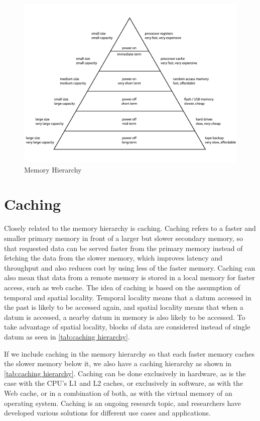 \documentclass[
	12pt,
	a4paper,
	abstract,
	bibliography=totoc,
	chapterprefix,
	headings=openright,
	numbers=endperiod,
	parskip=half,
	twoside,
]{scrreprt}
\begin{document}
\begin{figure}[ht]
	\centering
	\includegraphics[scale=0.6]{ComputerMemoryHierarchy.pdf}
	\caption{Memory Hierarchy \cite{wikiMemoryHierarchy}}
		\label{fig:memory hierarchy}
\end{figure}


\section{Caching}
\label{sec:caching}

Closely related to the memory hierarchy is caching.
Caching refers to a faster and smaller primary memory in front of a larger but slower secondary memory, 
so that requested data can be served faster from the primary memory instead of fetching the data from the slower memory, 
which improves latency and throughput and also reduces cost by using less of the faster memory.
Caching can also mean that data from a remote memory is stored in a local memory for faster access, such as web cache.
The idea of caching is based on the assumption of temporal and spatial locality.
Temporal locality means that a datum accessed in the past is likely to be accessed again, and
spatial locality means that when a datum is accessed, a nearby datum in memory is also likely to be accessed.
To take advantage of spatial locality, blocks of data are considered instead of single datum as seen 
in \cref{tab:caching hierarchy}.

If we include caching in the memory hierarchy so that each faster memory caches the slower memory below it, 
we also have a caching hierarchy as shown in \cref{tab:caching hierarchy}.
Caching can be done exclusively in hardware, as is the case with the CPU's L1 and L2 caches, 
or exclusively in software, as with the Web cache, or in a combination of both, as with the virtual memory of an operating system.
Caching is an ongoing research topic, and researchers have developed various solutions for different use cases and applications.
\end{document}
